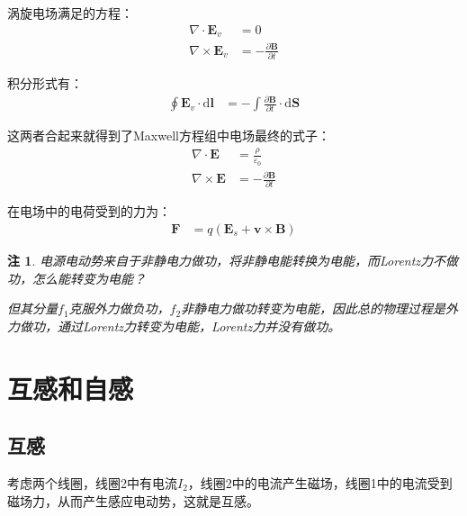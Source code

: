 \documentclass[12pt,onecolumn,a4paper]{book}
\newtheorem*{note}{注}
\numberwithin{table}{subsection}
\numberwithin{equation}{subsection}
\begin{document}
    涡旋电场满足的方程：
    \begin{align}
        \nabla \cdot \mathbf{E}_v  & = 0                                        \\
        \nabla \times \mathbf{E}_v & = - \frac{\partial \mathbf{B}}{\partial t}
    \end{align}

    积分形式有：
    \begin{align}
        \oint \mathbf{E}_v \cdot \mathrm{d} \mathbf{l} & = -  \int \frac{\partial\mathbf{B}}{\partial t} \cdot \mathrm{d} \mathbf{S}
    \end{align}

    这两者合起来就得到了Maxwell方程组中电场最终的式子：
    \begin{align}
        \nabla \cdot \mathbf{E}  & = \frac{\rho}{\varepsilon_0}               \\
        \nabla \times \mathbf{E} & = - \frac{\partial \mathbf{B}}{\partial t}
    \end{align}

    在电场中的电荷受到的力为：
    \begin{align}
        \mathbf{F} & = q (\mathbf{E}_s + \mathbf{v} \times \mathbf{B})
    \end{align}

    \begin{note}
        电源电动势来自于非静电力做功，将非静电能转换为电能，而Lorentz力不做功，怎么能转变为电能？

        但其分量$f_1$克服外力做负功，$f_2$非静电力做功转变为电能，因此总的物理过程是外力做功，通过Lorentz力转变为电能，Lorentz力并没有做功。
    \end{note}

    \section{互感和自感}

    \subsection{互感}

    考虑两个线圈，线圈2中有电流$I_2$，线圈2中的电流产生磁场，线圈1中的电流受到磁场力，从而产生感应电动势，这就是互感。
\end{document}
